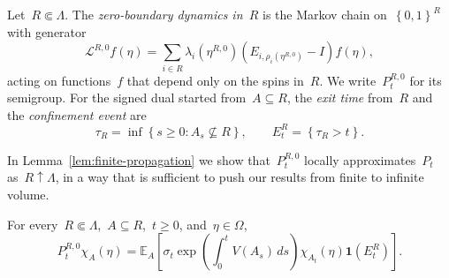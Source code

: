 \documentclass[EJP,preprint,NODS,nobera]{ejpecp}
\newcommand{\E}{\mathbb{E}}
\newcommand{\bb}[1]{\left(#1\right)}
\newcommand{\Cb}[1]{\left[#1\right]}
\newcommand{\cb}[1]{\left\{#1\right\}}
\newcommand{\ind}{\mathbf{1}}
\newcommand{\Lcal}{\mathcal{L}}
\begin{document}
\begin{definition}
\label{def:finite-volume}
Let~$R\Subset\Lambda$. The \emph{zero-boundary dynamics in~$R$} is the
Markov chain on~$\cb{0,1}^R$ with generator
\begin{equation}
\label{eq:zero-boundary-generator}
\Lcal^{R,0}f(\eta)
=
\sum_{i\in R}
\lambda_i\bb{\eta^{R,0}}
\bb{E_{i,\rho_i(\eta^{R,0})}-I}f(\eta),
\end{equation}
acting on functions~$f$ that depend only on the spins in~$R$. We write~$P_t^{R,0}$
for its semigroup. For the signed dual started from~$A\subseteq R$, the
\emph{exit time} from~$R$ and the \emph{confinement event} are
\begin{equation}
\label{eq:confinement-event}
\tau_R=\inf\cb{s\geq0:A_s\nsubseteq R},
\qquad
E_t^R=\cb{\tau_R>t}.
\end{equation}
\end{definition}
In Lemma~\ref{lem:finite-propagation} we show that~$P_t^{R,0}$ locally approximates~$P_t$ as~$R\uparrow \Lambda$, in a way that is sufficient to push our results from finite to infinite volume. 
\begin{proposition}
\label{thm:monomial-duality}
For every~$R\Subset\Lambda$,~$A\subseteq R$,~$t\geq0$, and~$\eta\in\Omega$,
\begin{equation}
\label{eq:monomial-feynman-kac-duality}
P_t^{R,0}\chi_A(\eta)
=
\E_A\Cb{
\sigma_t
\exp\bb{\int_0^t V(A_s)\,ds}
\chi_{A_t}(\eta)
\ind\bb{E_t^R}
}.
\end{equation}
\end{proposition}
\end{document}
